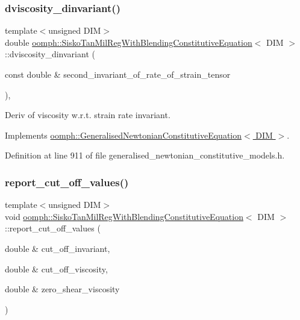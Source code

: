 \subsubsection{\texorpdfstring{dviscosity\+\_\+dinvariant()}{dviscosity\_dinvariant()}}
{\footnotesize\ttfamily template$<$unsigned D\+IM$>$ \\
double \hyperlink{classoomph_1_1SiskoTanMilRegWithBlendingConstitutiveEquation}{oomph\+::\+Sisko\+Tan\+Mil\+Reg\+With\+Blending\+Constitutive\+Equation}$<$ D\+IM $>$\+::dviscosity\+\_\+dinvariant (\begin{DoxyParamCaption}\item[{const double \&}]{second\+\_\+invariant\+\_\+of\+\_\+rate\+\_\+of\+\_\+strain\+\_\+tensor }\end{DoxyParamCaption})\hspace{0.3cm}{\ttfamily [inline]}, {\ttfamily [virtual]}}



Deriv of viscosity w.\+r.\+t. strain rate invariant. 



Implements \hyperlink{classoomph_1_1GeneralisedNewtonianConstitutiveEquation_ad0164e6ca57cc986048346e12c4d353a}{oomph\+::\+Generalised\+Newtonian\+Constitutive\+Equation$<$ D\+I\+M $>$}.



Definition at line 911 of file generalised\+\_\+newtonian\+\_\+constitutive\+\_\+models.\+h.

\mbox{\label{classoomph_1_1SiskoTanMilRegWithBlendingConstitutiveEquation_ab45c38b298775d7225bc8f03fa045294}} 
\subsubsection{\texorpdfstring{report\+\_\+cut\+\_\+off\+\_\+values()}{report\_cut\_off\_values()}}
{\footnotesize\ttfamily template$<$unsigned D\+IM$>$ \\
void \hyperlink{classoomph_1_1SiskoTanMilRegWithBlendingConstitutiveEquation}{oomph\+::\+Sisko\+Tan\+Mil\+Reg\+With\+Blending\+Constitutive\+Equation}$<$ D\+IM $>$\+::report\+\_\+cut\+\_\+off\+\_\+values (\begin{DoxyParamCaption}\item[{double \&}]{cut\+\_\+off\+\_\+invariant,  }\item[{double \&}]{cut\+\_\+off\+\_\+viscosity,  }\item[{double \&}]{zero\+\_\+shear\+\_\+viscosity }\end{DoxyParamCaption})\hspace{0.3cm}{\ttfamily [inline]}}



